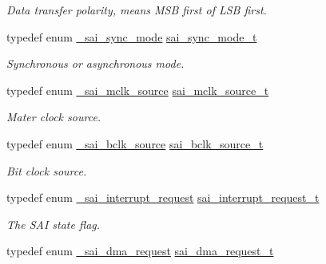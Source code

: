 \begin{DoxyCompactItemize}
\begin{DoxyCompactList}\small\item\em Data transfer polarity, means M\+SB first of L\+SB first. \end{DoxyCompactList}\item 
typedef enum \hyperlink{group__sai__hal_ga40bad4fe84f0826fe0565c46f0763395}{\+\_\+sai\+\_\+sync\+\_\+mode} \hyperlink{group__sai__hal_ga0cc249bf49da9d53829d1e1eabc8cc91}{sai\+\_\+sync\+\_\+mode\+\_\+t}\hypertarget{group__sai__hal_ga0cc249bf49da9d53829d1e1eabc8cc91}{}\label{group__sai__hal_ga0cc249bf49da9d53829d1e1eabc8cc91}

\begin{DoxyCompactList}\small\item\em Synchronous or asynchronous mode. \end{DoxyCompactList}\item 
typedef enum \hyperlink{group__sai__hal_gaaecbbb83a43bd9cfb1e3e96a049350a7}{\+\_\+sai\+\_\+mclk\+\_\+source} \hyperlink{group__sai__hal_ga2714d9e49839eb3c8f22ffa73a5ba9fe}{sai\+\_\+mclk\+\_\+source\+\_\+t}\hypertarget{group__sai__hal_ga2714d9e49839eb3c8f22ffa73a5ba9fe}{}\label{group__sai__hal_ga2714d9e49839eb3c8f22ffa73a5ba9fe}

\begin{DoxyCompactList}\small\item\em Mater clock source. \end{DoxyCompactList}\item 
typedef enum \hyperlink{group__sai__hal_gae133d8e667ce98cdb9f7b3e4d60679ff}{\+\_\+sai\+\_\+bclk\+\_\+source} \hyperlink{group__sai__hal_ga048c6fc58b414c5f571ad47b1923470b}{sai\+\_\+bclk\+\_\+source\+\_\+t}\hypertarget{group__sai__hal_ga048c6fc58b414c5f571ad47b1923470b}{}\label{group__sai__hal_ga048c6fc58b414c5f571ad47b1923470b}

\begin{DoxyCompactList}\small\item\em Bit clock source. \end{DoxyCompactList}\item 
typedef enum \hyperlink{group__sai__hal_ga85456b4cb780b26903bf8df1c5fa80e2}{\+\_\+sai\+\_\+interrupt\+\_\+request} \hyperlink{group__sai__hal_ga9bdde8d5136f0ba14347482d291dcb4e}{sai\+\_\+interrupt\+\_\+request\+\_\+t}\hypertarget{group__sai__hal_ga9bdde8d5136f0ba14347482d291dcb4e}{}\label{group__sai__hal_ga9bdde8d5136f0ba14347482d291dcb4e}

\begin{DoxyCompactList}\small\item\em The S\+AI state flag. \end{DoxyCompactList}\item 
typedef enum \hyperlink{group__sai__hal_gac39699ac34d770c6bc83dd2c92ecd9d9}{\+\_\+sai\+\_\+dma\+\_\+request} \hyperlink{group__sai__hal_gad39105ce78413d7c5c27ee1d56e6e003}{sai\+\_\+dma\+\_\+request\+\_\+t}\hypertarget{group__sai__hal_gad39105ce78413d7c5c27ee1d56e6e003}{}\label{group__sai__hal_gad39105ce78413d7c5c27ee1d56e6e003}


\end{DoxyCompactItemize}
